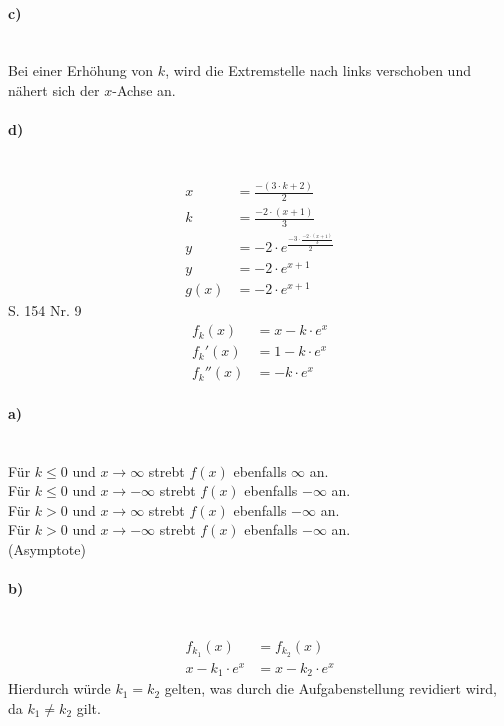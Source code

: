 \documentclass[a4paper, 12pt]{report}
\begin{document}
	\paragraph{c)} \mbox{} \\
	Bei einer Erhöhung von $k$, wird die Extremstelle nach links verschoben und nähert sich der $x$-Achse an.
	
	\paragraph{d)} \mbox{} \\
	\begin{align*}
		x &= \frac{-(3 \cdot k + 2)}{2} \\
		k &= \frac{-2 \cdot (x + 1)}{3} \\
		y &=-2 \cdot e^{
			\frac{
				-3 \cdot \frac{-2 \cdot (x + 1)}{3}
			}{2}
		} \\
		y &= -2 \cdot e^{x + 1} \\
		g(x) &= -2 \cdot e^{x + 1}
	\end{align*}
	\Large S. 154 Nr. 9
	\\
	\large
	\begin{align*}
		f_k(x) &= x - k \cdot e^x \\
		f_k'(x) &= 1 - k \cdot e^{x} \\
		f_k''(x) &= -k \cdot e^{x}
	\end{align*}
	\paragraph{a)} \mbox{} \\
	Für $k \leq 0$ und $x \to \infty$ strebt $f(x)$ ebenfalls $\infty$ an. \\
	Für $k \leq 0$ und $x \to -\infty$ strebt $f(x)$ ebenfalls $-\infty$ an. \\
	Für $k > 0$ und $x \to \infty$ strebt $f(x)$ ebenfalls $-\infty$ an. \\
	Für $k > 0$ und $x \to -\infty$ strebt $f(x)$ ebenfalls $-\infty$ an. \\
	(Asymptote)
	\paragraph{b)} \mbox{} \\
	\begin{align*}
		f_{k_1}(x) &= f_{k_2}(x) \\
		x - k_1 \cdot e^x &= x - k_2 \cdot e^x 
	\end{align*}
	Hierdurch würde $k_1 = k_2$ gelten, was durch die Aufgabenstellung revidiert wird, da $k_1 \ne k_2$ gilt.
	
\end{document}
